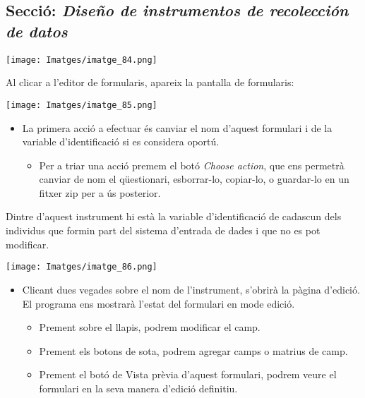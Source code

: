 \documentclass[
]{article}
\providecommand{\tightlist}{%
  \setlength{\itemsep}{0pt}\setlength{\parskip}{0pt}}
\begin{document}
\hypertarget{secciuxf3-diseuxf1o-de-instrumentos-de-recolecciuxf3n-de-datos}{%
\subsection{\texorpdfstring{\textbf{Secció:} \emph{Diseño de instrumentos de recolección de datos}}{Secció: Diseño de instrumentos de recolección de datos}}\label{secciuxf3-diseuxf1o-de-instrumentos-de-recolecciuxf3n-de-datos}}

\texttt{[image: Imatges/imatge\_84.png]}

Al clicar a l'editor de formularis, apareix la pantalla de formularis:

\texttt{[image: Imatges/imatge\_85.png]}

\begin{itemize}
\tightlist
\item
  La primera acció a efectuar és canviar el nom d'aquest formulari i de la variable d'identificació si es considera oportú.

  \begin{itemize}
  \tightlist
  \item
    Per a triar una acció premem el botó \emph{Choose action}, que ens permetrà canviar de nom el qüestionari, esborrar-lo, copiar-lo, o guardar-lo en un fitxer zip per a ús posterior.
  \end{itemize}
\end{itemize}

Dintre d'aquest instrument hi està la variable d'identificació de cadascun dels individus que formin part del sistema d'entrada de dades i que no es pot modificar.

\texttt{[image: Imatges/imatge\_86.png]}

\begin{itemize}
\tightlist
\item
  Clicant dues vegades sobre el nom de l'instrument, s'obrirà la pàgina d'edició. El programa ens mostrarà l'estat del formulari en mode edició.

  \begin{itemize}
  \tightlist
  \item
    Prement sobre el llapis, podrem modificar el camp.
  \item
    Prement els botons de sota, podrem agregar camps o matrius de camp.
  \item
    Prement el botó de Vista prèvia d'aquest formulari, podrem veure el formulari en la seva manera d'edició definitiu.
  \end{itemize}
\end{itemize}
\end{document}
